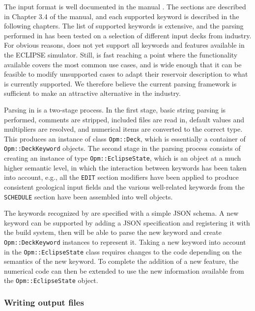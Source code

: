 The input format is well documented in the \opmflow
manual \citep{flowmanual}. The sections are described in Chapter 3.4
of the manual, and each supported keyword is described in the following
chapters. The list of supported keywords is extensive, and the
parsing performed in \opmflow has been tested on a selection of 
different input decks from industry. For obvious reasons, \opmflow does not yet
support all keywords and features available
in the ECLIPSE simulator. Still, \opmflow is fast reaching a point where
the functionality available covers the most common use cases, and is
wide enough that it can be feasible to modify unsupported cases to
adapt their reservoir description to what is currently supported.  We therefore
believe the current parsing framework is sufficient to make \opmflow an
attractive alternative in the industry.

Parsing in \opmflow is a two-stage process. In the first stage, basic
string parsing is performed, comments are stripped, included files are read in,
default values and multipliers are resolved, and numerical items are converted to
the correct type. This produces an instance of
class \texttt{Opm::Deck}, which is essentially a container of
\texttt{Opm::DeckKeyword} objects. The second stage in the parsing process
consists of creating an instance of type \texttt{Opm::EclipseState}, which is 
an object at a much higher semantic level, in which the
interaction between keywords has been taken into account, e.g., all the
\texttt{EDIT} section modifiers have been applied to produce consistent
geological input fields and the various well-related keywords from the
\texttt{SCHEDULE} section have been assembled into well objects.

The keywords recognized by \opmflow are specified with a simple JSON schema.
A new keyword can be supported by adding a JSON specification
and registering it with the build system, then \opmflow will be able to
parse the new keyword and create \texttt{Opm::DeckKeyword} instances to represent it.
Taking a new keyword into account in the \texttt{Opm::EclipseState} class
requires changes to the code depending on the semantics of
the new keyword. To complete the addition of a new feature, the
numerical code can then be extended to use the new information
available from the \texttt{Opm::EclipseState} object.

\subsubsection{Writing output files}

